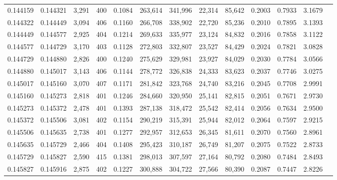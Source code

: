 \begin{tabular}{rrrrrrrrrrrrr}
0.144159 & 0.144321 & 3,291 & 400 &                                     0.1084 & 263,614 & 341,996 &  22,314 &  85,642 & 0.2003 & 0.7933 & 3.1679 \\
0.144322 & 0.144449 & 3,094 & 406 &                                     0.1160 & 266,708 & 338,902 &  22,720 &  85,236 & 0.2010 & 0.7895 & 3.1393 \\
0.144449 & 0.144577 & 2,925 & 404 &                                     0.1214 & 269,633 & 335,977 &  23,124 &  84,832 & 0.2016 & 0.7858 & 3.1122 \\
0.144577 & 0.144729 & 3,170 & 403 &                                     0.1128 & 272,803 & 332,807 &  23,527 &  84,429 & 0.2024 & 0.7821 & 3.0828 \\
0.144729 & 0.144880 & 2,826 & 400 &                                     0.1240 & 275,629 & 329,981 &  23,927 &  84,029 & 0.2030 & 0.7784 & 3.0566 \\
0.144880 & 0.145017 & 3,143 & 406 &                                     0.1144 & 278,772 & 326,838 &  24,333 &  83,623 & 0.2037 & 0.7746 & 3.0275 \\
0.145017 & 0.145160 & 3,070 & 407 &                                     0.1171 & 281,842 & 323,768 &  24,740 &  83,216 & 0.2045 & 0.7708 & 2.9991 \\
0.145160 & 0.145273 & 2,818 & 401 &                                     0.1246 & 284,660 & 320,950 &  25,141 &  82,815 & 0.2051 & 0.7671 & 2.9730 \\
0.145273 & 0.145372 & 2,478 & 401 &                                     0.1393 & 287,138 & 318,472 &  25,542 &  82,414 & 0.2056 & 0.7634 & 2.9500 \\
0.145372 & 0.145506 & 3,081 & 402 &                                     0.1154 & 290,219 & 315,391 &  25,944 &  82,012 & 0.2064 & 0.7597 & 2.9215 \\
0.145506 & 0.145635 & 2,738 & 401 &                                     0.1277 & 292,957 & 312,653 &  26,345 &  81,611 & 0.2070 & 0.7560 & 2.8961 \\
0.145635 & 0.145729 & 2,466 & 404 &                                     0.1408 & 295,423 & 310,187 &  26,749 &  81,207 & 0.2075 & 0.7522 & 2.8733 \\
0.145729 & 0.145827 & 2,590 & 415 &                                     0.1381 & 298,013 & 307,597 &  27,164 &  80,792 & 0.2080 & 0.7484 & 2.8493 \\
0.145827 & 0.145916 & 2,875 & 402 &                                     0.1227 & 300,888 & 304,722 &  27,566 &  80,390 & 0.2087 & 0.7447 & 2.8226 \\

\end{tabular}
